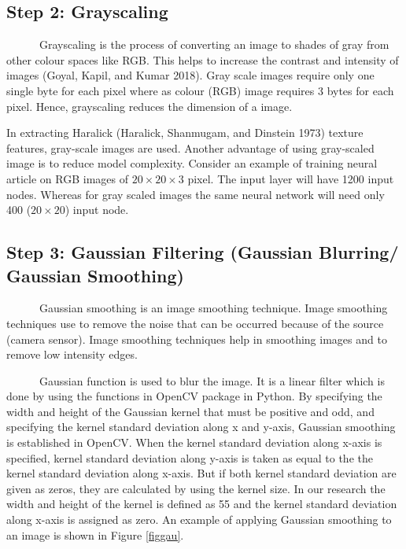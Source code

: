 \documentclass{article}
\begin{document}
\hypertarget{step-2-grayscaling}{%
\subsection{Step 2: Grayscaling}\label{step-2-grayscaling}}

~~~~~~Grayscaling is the process of converting an image to shades of
gray from other colour spaces like RGB. This helps to increase the
contrast and intensity of images (Goyal, Kapil, and Kumar 2018). Gray
scale images require only one single byte for each pixel where as colour
(RGB) image requires 3 bytes for each pixel. Hence, grayscaling reduces
the dimension of a image.

In extracting Haralick (Haralick, Shanmugam, and Dinstein 1973) texture
features, gray-scale images are used. Another advantage of using
gray-scaled image is to reduce model complexity. Consider an example of
training neural article on RGB images of \(20 \times 20 \times 3\)
pixel. The input layer will have 1200 input nodes. Whereas for gray
scaled images the same neural network will need only 400
(\(20 \times 20\)) input node.

\hypertarget{step-3-gaussian-filtering-gaussian-blurring-gaussian-smoothing}{%
\subsection{Step 3: Gaussian Filtering (Gaussian Blurring/ Gaussian
Smoothing)}\label{step-3-gaussian-filtering-gaussian-blurring-gaussian-smoothing}}

~~~~~~Gaussian smoothing is an image smoothing technique. Image
smoothing techniques use to remove the noise that can be occurred
because of the source (camera sensor). Image smoothing techniques help
in smoothing images and to remove low intensity edges.

~~~~~~Gaussian function is used to blur the image. It is a linear filter
which is done by using the functions in OpenCV package in Python. By
specifying the width and height of the Gaussian kernel that must be
positive and odd, and specifying the kernel standard deviation along x
and y-axis, Gaussian smoothing is established in OpenCV. When the kernel
standard deviation along x-axis is specified, kernel standard deviation
along y-axis is taken as equal to the the kernel standard deviation
along x-axis. But if both kernel standard deviation are given as zeros,
they are calculated by using the kernel size. In our research the width
and height of the kernel is defined as 55 and the kernel standard
deviation along x-axis is assigned as zero. An example of applying
Gaussian smoothing to an image is shown in Figure \ref{figgau}.
\end{document}
